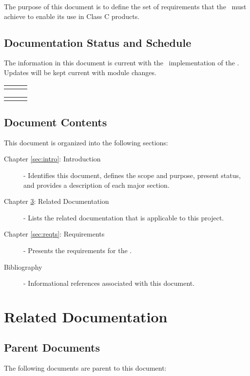 \documentclass[twoside,11pt,titlepage]{report}
\begin{document}
The purpose of this document is to define the set
of requirements that the \MODEL\ must achieve to enable
its use in Class C products.

\section{Documentation Status and Schedule}
The information in this document is current with the \TrickHLAid\
implementation of the \MODEL. Updates will be kept current with
module changes.

\begin{tabular}{||l|l|l|} \hline
\documentHistory
\end{tabular}

\begin{tabular}{||l|l|l|} \hline
\DocumentChangeHistory
\end{tabular}

\section{Document Contents}
This document is organized into the following sections:

\begin{description}

\item[Chapter \ref{sec:intro}: Introduction] -
Identifies this document, defines the scope and purpose, present status,
and provides a description of each major section.

\item[Chapter \ref{sec:docs}: Related Documentation] -
Lists the related documentation that is applicable to this project.

\item[Chapter \ref{sec:reqts}: Requirements] -
Presents the requirements for the \MODEL.

\item[Bibliography] -
Informational references associated with this document.

\end{description}

\chapter{Related Documentation}\label{sec:docs}

\section{Parent Documents}
The following documents are parent to this document:
\end{document}
